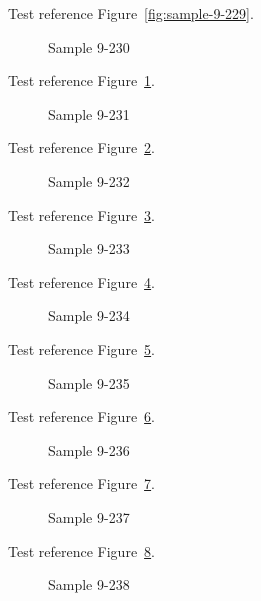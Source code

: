 Test reference Figure~\ref{fig:sample-9-229}.

\begin{figure}[tbhp]
\caption{Sample 9-230}
\label{fig:sample-9-230}
\end{figure}

Test reference Figure~\ref{fig:sample-9-230}.

\begin{figure}[tbhp]
\caption{Sample 9-231}
\label{fig:sample-9-231}
\end{figure}

Test reference Figure~\ref{fig:sample-9-231}.

\begin{figure}[tbhp]
\caption{Sample 9-232}
\label{fig:sample-9-232}
\end{figure}

Test reference Figure~\ref{fig:sample-9-232}.

\begin{figure}[tbhp]
\caption{Sample 9-233}
\label{fig:sample-9-233}
\end{figure}

Test reference Figure~\ref{fig:sample-9-233}.

\begin{figure}[tbhp]
\caption{Sample 9-234}
\label{fig:sample-9-234}
\end{figure}

Test reference Figure~\ref{fig:sample-9-234}.

\begin{figure}[tbhp]
\caption{Sample 9-235}
\label{fig:sample-9-235}
\end{figure}

Test reference Figure~\ref{fig:sample-9-235}.

\begin{figure}[tbhp]
\caption{Sample 9-236}
\label{fig:sample-9-236}
\end{figure}

Test reference Figure~\ref{fig:sample-9-236}.

\begin{figure}[tbhp]
\caption{Sample 9-237}
\label{fig:sample-9-237}
\end{figure}

Test reference Figure~\ref{fig:sample-9-237}.

\begin{figure}[tbhp]
\caption{Sample 9-238}
\label{fig:sample-9-238}
\end{figure}

